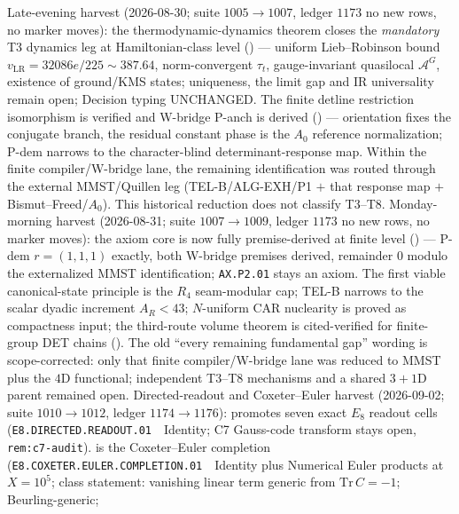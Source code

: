 \documentclass[11pt,a4paper]{article}
\begin{document}
\begin{keybox}
Late-evening harvest (2026-08-30; suite $1005\to1007$, ledger $1173$ no new rows, no marker moves):
the thermodynamic-dynamics theorem closes the \emph{mandatory} T3 dynamics leg at
Hamiltonian-class level
() ---
uniform Lieb--Robinson bound $v_{\mathrm{LR}}=32086e/225\sim387.64$, norm-convergent $\tau_t$,
gauge-invariant quasilocal $\mathcal A^G$, existence of ground/KMS states; uniqueness, the
limit gap and IR universality remain open; Decision typing UNCHANGED.
The finite detline restriction isomorphism is verified and W-bridge P-anch is derived
() ---
orientation fixes the conjugate branch, the residual constant phase is the $A_0$
reference normalization; P-dem narrows to the character-blind determinant-response map.
Within the finite compiler/W-bridge lane, the remaining identification was routed through
the external MMST/Quillen leg (TEL-B/ALG-EXH/P1 $+$ that response map $+$
Bismut--Freed/$A_0$).  This historical reduction does not classify T3--T8.
Monday-morning harvest (2026-08-31; suite $1007\to1009$, ledger $1173$ no new rows, no marker moves):
the axiom core is now fully premise-derived at finite level
() ---
P-dem $r=(1,1,1)$ exactly, both W-bridge premises derived, remainder $0$ modulo the
externalized MMST identification; \texttt{AX.P2.01} stays an axiom.
The first viable canonical-state principle is the $R_4$ seam-modular cap; TEL-B narrows
to the scalar dyadic increment $A_R<43$; $N$-uniform CAR nuclearity is proved as compactness
input; the third-route volume theorem is cited-verified for finite-group DET chains
().
The old ``every remaining fundamental gap'' wording is scope-corrected: only that finite
compiler/W-bridge lane was reduced to MMST plus the $4$D functional; independent T3--T8
mechanisms and a shared $3{+}1$D parent remained open.
Directed-readout and Coxeter--Euler harvest (2026-09-02; suite $1010\to1012$, ledger $1174\to1176$):
promotes seven exact $E_8$ readout cells (\texttt{E8.DIRECTED.READOUT.01}~\mE\ Identity;
C7 Gauss-code transform stays open, \texttt{rem:c7-audit}).
is the Coxeter--Euler completion (\texttt{E8.COXETER.EULER.COMPLETION.01}~\mE\ Identity plus Numerical Euler products at $X=10^5$;
class statement: vanishing linear term generic from $\mathrm{Tr}\,C=-1$; Beurling-generic;

\end{keybox}
\end{document}
